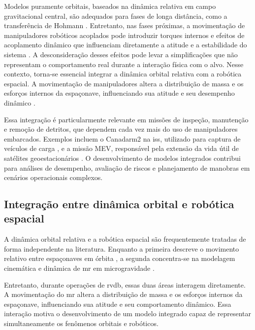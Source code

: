 
Modelos puramente orbitais, baseados na dinâmica relativa em campo gravitacional central, são adequados para fases de longa distância, como a transferência de Hohmann \cite{weberHohmann}.
Entretanto, nas fases próximas, a movimentação de manipuladores robóticos acoplados pode introduzir torques internos e efeitos de acoplamento dinâmico que influenciam diretamente a atitude e a estabilidade do sistema \cite{nardin2017_simulador}. A desconsideração desses efeitos pode levar a simplificações que não representam o comportamento real durante a interação física com o alvo.
Nesse contexto, torna-se essencial integrar a dinâmica orbital relativa com a robótica espacial. A movimentação de manipuladores altera a distribuição de massa e os esforços internos da espaçonave, influenciando sua atitude e seu desempenho dinâmico \cite{yoshida_reactionless_etsvii}.


Essa integração é particularmente relevante em missões de inspeção, manutenção e remoção de detritos, que dependem cada vez mais do uso de manipuladores embarcados.
Exemplos incluem o Canadarm2 na \gls{iss}, utilizado para captura de veículos de carga \cite{canadarm2}, e a missão MEV, responsável pela extensão da vida útil de satélites geoestacionários \cite{mev_northrop}.
O desenvolvimento de modelos integrados contribui para análises de desempenho, avaliação de riscos e planejamento de manobras em cenários operacionais complexos. 

\subsection{Integração entre dinâmica orbital e robótica espacial}

A dinâmica orbital relativa e a robótica espacial são frequentemente tratadas de forma independente na literatura.
Enquanto a primeira descreve o movimento relativo entre espaçonaves em órbita \cite{fehse2003}, a segunda concentra-se na modelagem cinemática e dinâmica de \gls{mr} em microgravidade \cite{yoshida_reactionless_etsvii}.

Entretanto, durante operações de \gls{rvdb}, essas duas áreas interagem diretamente.
A movimentação do \gls{mr} altera a distribuição de massa e os esforços internos da espaçonave, influenciando sua atitude e seu comportamento dinâmico. Essa interação motiva o desenvolvimento de um modelo integrado capaz de representar simultaneamente os fenômenos orbitais e robóticos.


